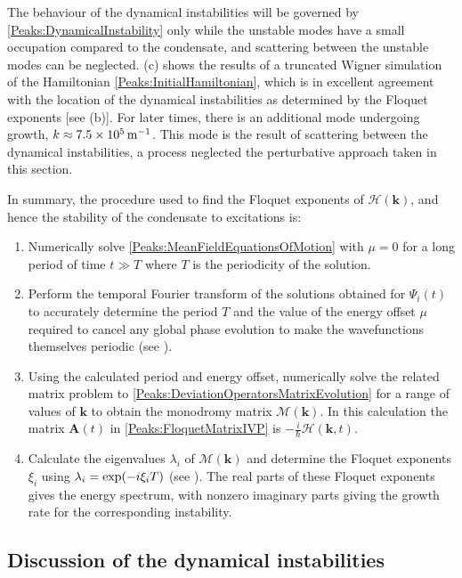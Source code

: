 The behaviour of the dynamical instabilities will be governed by \eqref{Peaks:DynamicalInstability} only while the unstable modes have a small occupation compared to the condensate, and scattering between the unstable modes can be neglected. (c) shows the results of a truncated Wigner simulation of the Hamiltonian \eqref{Peaks:InitialHamiltonian}, which is in excellent agreement with the location of the dynamical instabilities as determined by the Floquet exponents [see (b)]. For later times, there is an additional mode undergoing growth, $k \approx \unit[7.5\times 10^5]{m}^{-1}$. This mode is the result of scattering between the dynamical instabilities, a process neglected the perturbative approach taken in this section. 

\parasep

In summary, the procedure used to find the Floquet exponents of $\mathcal{H}(\bm{k})$, and hence the stability of the condensate to excitations is:
\begin{enumerate}
    \item Numerically solve \eqref{Peaks:MeanFieldEquationsOfMotion} with $\mu=0$ for a long period of time $t \gg T$ where $T$ is the periodicity of the solution.
    \item Perform the temporal Fourier transform of the solutions obtained for $\Psi_i(t)$ to accurately determine the period $T$ and the value of the energy offset $\mu$ required to cancel any global phase evolution to make the wavefunctions themselves periodic (see ).
    \item Using the calculated period and energy offset, numerically solve the related matrix problem to \eqref{Peaks:DeviationOperatorsMatrixEvolution} for a range of values of $\bm{k}$ to obtain the monodromy matrix $\mathcal{M}(\bm{k})$. In this calculation the matrix $\bm{A}(t)$ in \eqref{Peaks:FloquetMatrixIVP} is $\displaystyle -\frac{i}{\hbar}\mathcal{H}(\bm{k}, t)$.
    \item Calculate the eigenvalues $\lambda_i$ of $\mathcal{M}(\bm{k})$ and determine the Floquet exponents $\xi_i$ using $\protect{\lambda_i = \exp(-i \xi_i T)}$ (see ). The real parts of these Floquet exponents gives the energy spectrum, with nonzero imaginary parts giving the growth rate for the corresponding instability.
\end{enumerate}

\subsection{Discussion of the dynamical instabilities}
\label{Peaks:DynamicalInstabilitiesDiscussion}

